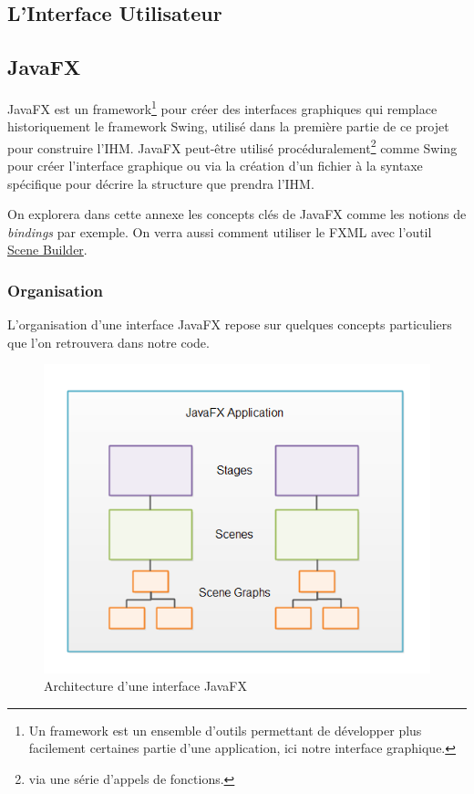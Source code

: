 \newenvironment{codeblock}{\captionsetup{type=listing}}{}

\addappheadtotoc

\begin{appendix}
\chapter{L'Interface Utilisateur}

\section{JavaFX}
\label{javafx}

JavaFX est un framework\footnote{Un framework est un ensemble d'outils permettant de développer plus facilement certaines partie d'une application, ici notre interface graphique.} pour créer des interfaces graphiques qui remplace historiquement le framework Swing, utilisé dans la première partie de ce projet pour construire l'IHM. JavaFX peut-être utilisé procéduralement\footnote{via une série d'appels de fonctions.} comme Swing pour créer l'interface graphique ou via la création d'un fichier à la syntaxe spécifique pour décrire la structure que prendra l'IHM.

On explorera dans cette annexe les concepts clés de JavaFX comme les notions de \textit{bindings} par exemple. On verra aussi comment utiliser le FXML avec l'outil \href{https://gluonhq.com/products/scene-builder/}{Scene Builder}.

\subsection{Organisation}

L'organisation d'une interface JavaFX repose sur quelques concepts particuliers que l'on retrouvera dans notre code.

\begin{figure}[p]
  \centering
  \includegraphics{./media/javafx-architecture.png}
  \caption{Architecture d'une interface JavaFX}
\end{figure}


\end{appendix}
